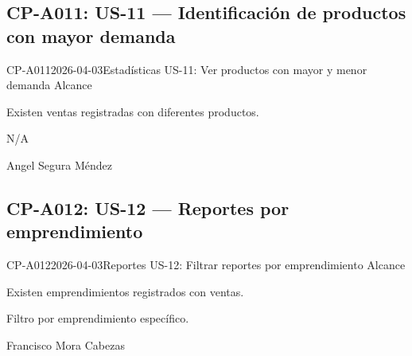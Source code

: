 \subsection{CP-A011: US-11 --- Identificación de productos con mayor demanda}
\def\cpPasos{%
  \item Navegar a Estadísticas.
  \item Verificar sección de productos más/menos vendidos.
  \item Verificar sección de emprendimientos por ingresos.}
\def\cpResultadoE{%
  \item Se muestran los productos más y menos vendidos con métricas de cantidad.}
\def\cpResultadoO{Estadísticas muestra: productos más vendidos y menos vendidos con
  cantidad vendida, emprendimientos con gráfico de ingresos, e indicador de productos
  con stock bajo al final de la página.}
\casoprueba
  {CP-A011}{2026-04-03}{Estadísticas}
  {US-11: Ver productos con mayor y menor demanda}
  {Alcance}{\estadoAprobado}
  {\item Existen ventas registradas con diferentes productos.}
  {\item N/A}
  {Angel Segura Méndez}

\subsection{CP-A012: US-12 --- Reportes por emprendimiento}
\def\cpPasos{%
  \item Navegar a Reportes.
  \item Seleccionar un emprendimiento específico en el filtro.
  \item Generar el reporte.}
\def\cpResultadoE{%
  \item El reporte muestra solo las ventas del emprendimiento seleccionado.}
\def\cpResultadoO{El módulo de Reportes permite filtrar por emprendimiento. El reporte
  mostró correctamente solo los datos del emprendimiento seleccionado.}
\casoprueba
  {CP-A012}{2026-04-03}{Reportes}
  {US-12: Filtrar reportes por emprendimiento}
  {Alcance}{\estadoAprobado}
  {\item Existen emprendimientos registrados con ventas.}
  {\item Filtro por emprendimiento específico.}
  {Francisco Mora Cabezas}

